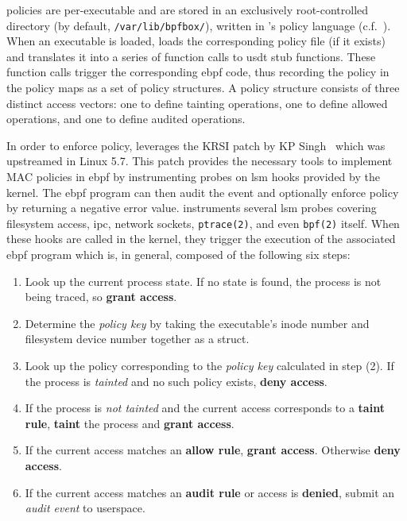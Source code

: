 \bpfbox{} policies are per-executable and are stored in an exclusively root-controlled
directory (by default, \texttt{/var/lib/bpfbox/}), written in \bpfbox{}'s policy language
(c.f.\ ). When an executable is loaded, \bpfbox{} loads the corresponding
policy file (if it exists) and translates it into a series of function calls to \gls{usdt}
stub functions.  These function calls trigger the corresponding \gls{ebpf} code, thus recording
the policy in the policy maps as a set of policy structures.  A policy structure consists
of three distinct access vectors: one to define tainting operations, one to define allowed
operations, and one to define audited operations.

In order to enforce policy, \bpfbox{} leverages the KRSI patch by KP
Singh~\cite{singh2019_krsi, corbet2019_krsi} which was upstreamed in Linux
5.7. This patch provides the necessary tools to implement MAC policies in \gls{ebpf} by
instrumenting probes on \gls{lsm} hooks provided by the kernel. The \gls{ebpf} program can then
audit the event and optionally enforce policy by returning a negative error value.
\bpfbox{} instruments several \gls{lsm} probes covering filesystem access, \gls{ipc}, network
sockets, \texttt{ptrace(2)}, and even \texttt{bpf(2)} itself.  When these hooks are
called in the kernel, they trigger the execution of the associated \gls{ebpf} program which
is, in general, composed of the following six steps:
\begin{enumerate}
\item Look up the current process state.  If no state is found, the process is
      not being traced, so \textbf{grant access}.
\item Determine the \textit{policy key} by taking the executable's inode
      number and filesystem device number together as a struct.
\item Look up the policy corresponding to the \textit{policy key} calculated in step (2). If the
      process is \textit{tainted} and no such policy exists, \textbf{deny access}.
\item If the process is \textit{not tainted} and the current access corresponds to
      a \textbf{taint rule}, \textbf{taint} the process and \textbf{grant access}.
\item If the current access matches an \textbf{allow rule}, \textbf{grant access}.
      Otherwise \textbf{deny access}.
\item If the current access matches an \textbf{audit rule} or access is \textbf{denied},
      submit an \textit{audit event} to userspace.
\end{enumerate}


